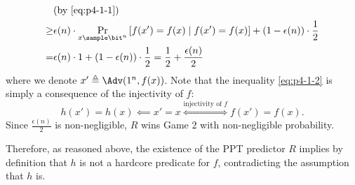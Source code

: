 \begin{answer}[i]
\begin{align}
        & \textrm{(by \eqref{eq:p4-1-1})} \notag\\
    \ge& \epsilon(n)\cdot \Pr_{x\sample\bit^n}\left[ f(x') = f(x) \mid f(x')=f(x)\right] 
        + \left( 1- \epsilon(n) \right)\cdot \frac{1}{2} \label{eq:p4-1-2}\\
    =& \epsilon(n)\cdot 1 + \left( 1- \epsilon(n) \right)\cdot \frac{1}{2}
    = \frac{1}{2}+\frac{\epsilon(n)}{2} \notag
\end{align}
where we denote $x'\triangleq \Adv(1^n, f(x))$. Note that the inequality \eqref{eq:p4-1-2} is simply a consequence of the injectivity of $f$:
\[
    h(x') = h(x) \impliedby x' = x \stackrel{\textrm{injectivity of } f}{\iff} f(x') = f(x).
\]
Since $\frac{\epsilon(n)}{2}$ is non-negligible, $R$ wins Game $2$ with non-negligible probability.

Therefore, as reasoned above, the existence of the PPT predictor $R$ implies by definition that $h$ is not a hardcore predicate for $f$, contradicting the assumption that $h$ is.
\end{answer}












